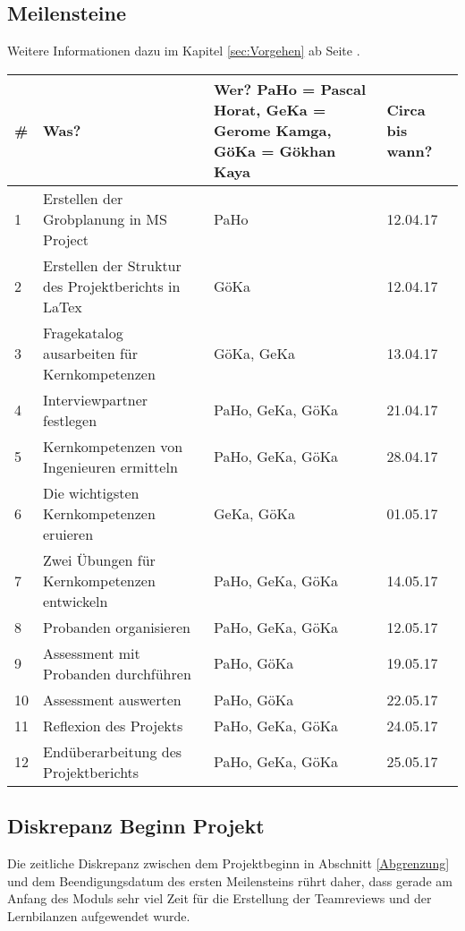 \subsection{Meilensteine}
Weitere Informationen dazu im Kapitel \ref{sec:Vorgehen} ab Seite \pageref{sec:Vorgehen}.\\

\begin{tabular}{ | p{0.3cm} | p{7.7cm} | p{4.3cm} | p{1.3cm} |}
    \hline
    \textbf{\#} & \textbf{Was?} & \textbf{Wer?} PaHo = Pascal Horat, GeKa = Gerome Kamga, GöKa = Gökhan Kaya & \textbf{Circa bis wann?} \\ \hline
    1 & Erstellen der Grobplanung in MS Project & PaHo & 12.04.17 \\ \hline
    2 & Erstellen der Struktur des Projektberichts in LaTex & GöKa & 12.04.17 \\ \hline
    3 & Fragekatalog ausarbeiten für Kernkompetenzen & GöKa, GeKa & 13.04.17 \\ \hline
    4 & Interviewpartner festlegen & PaHo, GeKa, GöKa & 21.04.17 \\ \hline
    5 & Kernkompetenzen von Ingenieuren ermitteln & PaHo, GeKa, GöKa & 28.04.17 \\ \hline
    6 & Die wichtigsten Kernkompetenzen eruieren & GeKa, GöKa & 01.05.17 \\ \hline
    7 & Zwei Übungen für Kernkompetenzen entwickeln & PaHo, GeKa, GöKa & 14.05.17 \\ \hline
    8 & Probanden organisieren & PaHo, GeKa, GöKa & 12.05.17 \\ \hline
    9 & Assessment mit Probanden durchführen & PaHo, GöKa & 19.05.17 \\ \hline
    10 & Assessment auswerten & PaHo, GöKa & 22.05.17 \\ \hline
    11 & Reflexion des Projekts & PaHo, GeKa, GöKa & 24.05.17 \\ \hline
    12 & Endüberarbeitung des Projektberichts & PaHo, GeKa, GöKa & 25.05.17 \\ \hline 
\end{tabular} 

\subsection{Diskrepanz Beginn Projekt}
Die zeitliche Diskrepanz zwischen dem Projektbeginn in Abschnitt \ref{Abgrenzung} und dem Beendigungsdatum des ersten Meilensteins rührt daher, dass gerade am Anfang des Moduls sehr viel Zeit für die Erstellung der Teamreviews und der Lernbilanzen aufgewendet wurde.

